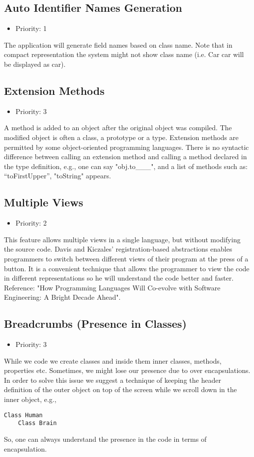 \subsection{Auto Identifier Names Generation}
\begin{itemize}
	\item Priority: 1
\end{itemize}
The application will generate field names based on class name. Note that in compact representation the system might not show class name (i.e. Car car will be displayed as car).
\subsection{Extension Methods}
\begin{itemize}
	\item Priority: 3
\end{itemize}
A method is added to an object after the original object was compiled. The modified object is often a class, a prototype or a type. Extension methods are permitted by some object-oriented programming languages. There is no syntactic difference between calling an extension method and calling a method declared in the type definition, e.g., one can say "obj.to\_\_\_", and a list of methods such as: “toFirstUpper”, "toString" appears.
\subsection{Multiple Views}
\begin{itemize}
	\item Priority: 2
\end{itemize}
This feature allows multiple views in a single language, but without modifying the source code. Davis and Kiczales’ registration-based abstractions enables programmers to switch between different views of their program at the press of a button. It is a convenient technique that allows the programmer to view the code in different representations so he will understand the code better and faster. Reference: "How Programming Languages Will Co-evolve with Software Engineering: A Bright Decade Ahead".
\subsection{Breadcrumbs (Presence in Classes)}
\begin{itemize}
	\item Priority: 3
\end{itemize}
While we code we create classes and inside them inner classes, methods, properties etc. Sometimes, we might lose our presence due to over encapsulations. In order to solve this issue we suggest a technique of keeping the header definition of the outer object on top of the screen while we scroll down in the inner object, e.g., 
\begin{lstlisting}
Class Human
	Class Brain
\end{lstlisting}
So, one can always understand the presence in the code in terms of encapsulation.
